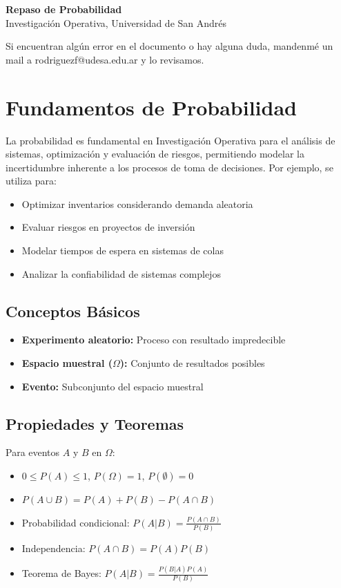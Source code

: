 \documentclass[12pt]{article}
\begin{document}
\begin{center}
    {\LARGE \textbf{Repaso de Probabilidad}}\\[0.5em]
    {Investigación Operativa, Universidad de San Andrés}
\end{center}

\vspace{0.5cm}

Si encuentran algún error en el documento o hay alguna duda, mandenmé un mail a rodriguezf@udesa.edu.ar y lo revisamos.

\section{Fundamentos de Probabilidad}

La probabilidad es fundamental en Investigación Operativa para el análisis de sistemas, optimización y evaluación de riesgos, permitiendo modelar la incertidumbre inherente a los procesos de toma de decisiones. Por ejemplo, se utiliza para:
\begin{itemize}
    \item Optimizar inventarios considerando demanda aleatoria
    \item Evaluar riesgos en proyectos de inversión
    \item Modelar tiempos de espera en sistemas de colas
    \item Analizar la confiabilidad de sistemas complejos
\end{itemize}

\subsection{Conceptos Básicos}
\begin{itemize}
    \item \textbf{Experimento aleatorio:} Proceso con resultado impredecible
    \item \textbf{Espacio muestral ($\Omega$):} Conjunto de resultados posibles
    \item \textbf{Evento:} Subconjunto del espacio muestral
\end{itemize}

\subsection{Propiedades y Teoremas}
Para eventos $A$ y $B$ en $\Omega$:
\begin{itemize}
    \item $0 \leq P(A) \leq 1$, $P(\Omega) = 1$, $P(\emptyset) = 0$
    \item $P(A \cup B) = P(A) + P(B) - P(A \cap B)$
    \item Probabilidad condicional: $P(A|B) = \frac{P(A \cap B)}{P(B)}$
    \item Independencia: $P(A \cap B) = P(A)P(B)$
    \item Teorema de Bayes: $P(A|B) = \frac{P(B|A)P(A)}{P(B)}$
\end{itemize}
\end{document}
